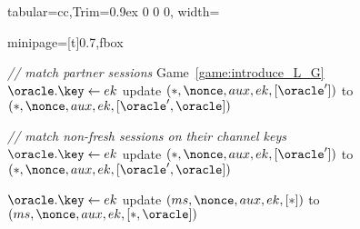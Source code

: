 \newcommand*{\codewidth}{0.7\linewidth}
\newcommand*{\codescale}{0.7}

\begin{figure}


\begin{leftfullpage}


\small

\setlength{\tabcolsep}{0.2pt}
\renewcommand{\arraystretch}{2}


\begin{adjustbox}{tabular={cc},Trim=0.9ex 0 0 0, width=\textwidth}
	\begin{adjustbox}{minipage=[t]{\codewidth},fbox}
		\begin{algorithmic}[1]	
		

			
			\color{hidecode}
			\State \textcolor{hidecode}{\emph{// match partner sessions}}
			\color{black}
			\Comment Game~\ref{game:introduce_L_G}
			\color{hidecode}
			\label{alg:line:send_game_hops_match_fresh}
				\State $\oracle.\key \gets ek$
				\State update $(*, \nonce, aux, ek, [\oracle'])$ to $(*, \nonce, aux, ek, [\oracle', \oracle])$
		
		
			\State \textcolor{hidecode}{\emph{// match non-fresh sessions on their channel keys}}
				\State $\oracle.\key \gets ek$
				\State update $(*, \nonce, aux, ek, [\oracle'])$ to $(*, \nonce, aux, ek, [\oracle', \oracle])$	
			
			\EndIf 
			
			\color{black}
			
		
			\State {}
			\label{alg:line:send_game_hops_catch_all_check}
				\State $\oracle.\key \gets ek$
				\State update $(ms, \nonce, aux, ek, [*])$ to $(ms, \nonce, aux, ek, [*,\oracle])$
				\label{alg:line:send_game_hops_catch_all_final_line}
			

\end{algorithmic}
\end{adjustbox}
\end{adjustbox}
\end{leftfullpage}
\end{figure}
